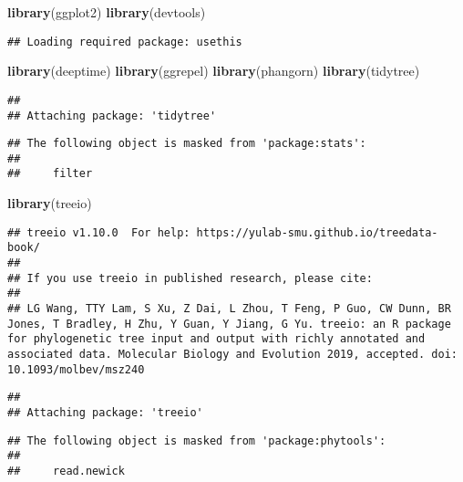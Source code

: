 \documentclass[
]{article}
\newenvironment{Shaded}{\begin{snugshade}}{\end{snugshade}}
\newcommand{\KeywordTok}[1]{\textcolor[rgb]{0.13,0.29,0.53}{\textbf{#1}}}
\newcommand{\NormalTok}[1]{#1}
\begin{document}
\begin{Shaded}
\begin{Highlighting}[]
\KeywordTok{library}\NormalTok{(ggplot2)}
\KeywordTok{library}\NormalTok{(devtools)}
\end{Highlighting}
\end{Shaded}

\begin{verbatim}
## Loading required package: usethis
\end{verbatim}

\begin{Shaded}
\begin{Highlighting}[]
\KeywordTok{library}\NormalTok{(deeptime)}
\KeywordTok{library}\NormalTok{(ggrepel)}
\KeywordTok{library}\NormalTok{(phangorn)}
\KeywordTok{library}\NormalTok{(tidytree)}
\end{Highlighting}
\end{Shaded}

\begin{verbatim}
## 
## Attaching package: 'tidytree'
\end{verbatim}

\begin{verbatim}
## The following object is masked from 'package:stats':
## 
##     filter
\end{verbatim}

\begin{Shaded}
\begin{Highlighting}[]
\KeywordTok{library}\NormalTok{(treeio)}
\end{Highlighting}
\end{Shaded}

\begin{verbatim}
## treeio v1.10.0  For help: https://yulab-smu.github.io/treedata-book/
## 
## If you use treeio in published research, please cite:
## 
## LG Wang, TTY Lam, S Xu, Z Dai, L Zhou, T Feng, P Guo, CW Dunn, BR Jones, T Bradley, H Zhu, Y Guan, Y Jiang, G Yu. treeio: an R package for phylogenetic tree input and output with richly annotated and associated data. Molecular Biology and Evolution 2019, accepted. doi: 10.1093/molbev/msz240
\end{verbatim}

\begin{verbatim}
## 
## Attaching package: 'treeio'
\end{verbatim}

\begin{verbatim}
## The following object is masked from 'package:phytools':
## 
##     read.newick
\end{verbatim}
\end{document}
